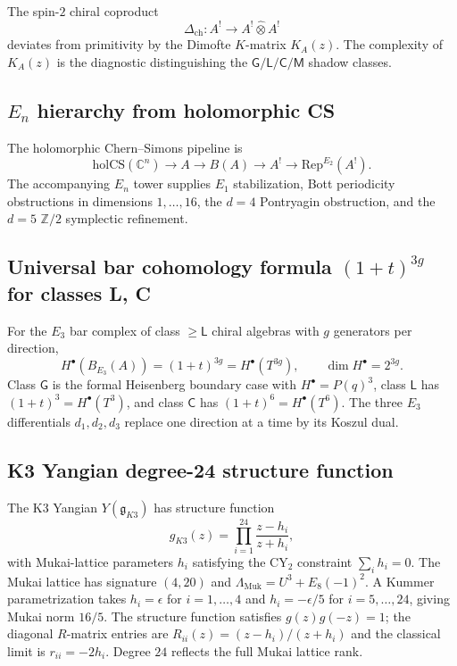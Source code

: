 \documentclass[11pt]{article}
\newcommand{\frakg}{\mathfrak{g}}
\newcommand{\Rep}{\mathrm{Rep}}
\newcommand{\C}{\mathbb{C}}
\newcommand{\Z}{\mathbb{Z}}
\theoremstyle{plain}
\theoremstyle{definition}
\theoremstyle{remark}
\begin{document}
The spin-$2$ chiral coproduct
\[
 \Delta_{\mathrm{ch}}\colon A^!\to A^!\widehat{\otimes}A^!
\]
deviates from primitivity by the Dimofte $K$-matrix $K_A(z)$. The
complexity of $K_A(z)$ is the diagnostic distinguishing the
$\mathsf{G}/\mathsf{L}/\mathsf{C}/\mathsf{M}$ shadow classes.

\subsection{$E_n$ hierarchy from holomorphic CS}

The holomorphic Chern--Simons pipeline is
\[
 \mathrm{holCS}(\C^n)\longrightarrow A\longrightarrow B(A)
 \longrightarrow A^!\longrightarrow \Rep^{E_2}(A^!).
\]
The accompanying $E_n$ tower supplies $E_1$ stabilization, Bott
periodicity obstructions in dimensions $1,\ldots,16$, the $d=4$
Pontryagin obstruction, and the $d=5$ $\Z/2$ symplectic refinement.

\subsection{Universal bar cohomology formula $(1+t)^{3g}$ for classes L, C}

For the $E_3$ bar complex of class $\geq\mathsf{L}$ chiral algebras
with $g$ generators per direction,
\[
 H^\bullet(B_{E_3}(A))=(1+t)^{3g}=H^\bullet(T^{3g}),
 \qquad \dim H^\bullet=2^{3g}.
\]
Class $\mathsf{G}$ is the formal Heisenberg boundary case with
$H^\bullet=P(q)^3$, class $\mathsf{L}$ has
$(1+t)^3=H^\bullet(T^3)$, and class $\mathsf{C}$ has
$(1+t)^6=H^\bullet(T^6)$. The three $E_3$ differentials
$d_1,d_2,d_3$ replace one direction at a time by its Koszul dual.

\subsection{K3 Yangian degree-24 structure function}

The K3 Yangian $Y(\frakg_{K3})$ has structure function
\[
 g_{K3}(z)=\prod_{i=1}^{24}\frac{z-h_i}{z+h_i},
\]
with Mukai-lattice parameters $h_i$ satisfying the CY$_2$ constraint
$\sum_i h_i=0$. The Mukai lattice has signature $(4,20)$ and
$\Lambda_{\mathrm{Muk}}=U^3+E_8(-1)^2$. A Kummer parametrization takes
$h_i=\epsilon$ for $i=1,\ldots,4$ and $h_i=-\epsilon/5$ for
$i=5,\ldots,24$, giving Mukai norm $16/5$. The structure function
satisfies $g(z)g(-z)=1$; the diagonal $R$-matrix entries are
$R_{ii}(z)=(z-h_i)/(z+h_i)$ and the classical limit is
$r_{ii}=-2h_i$. Degree $24$ reflects the full Mukai lattice rank.
\end{document}
